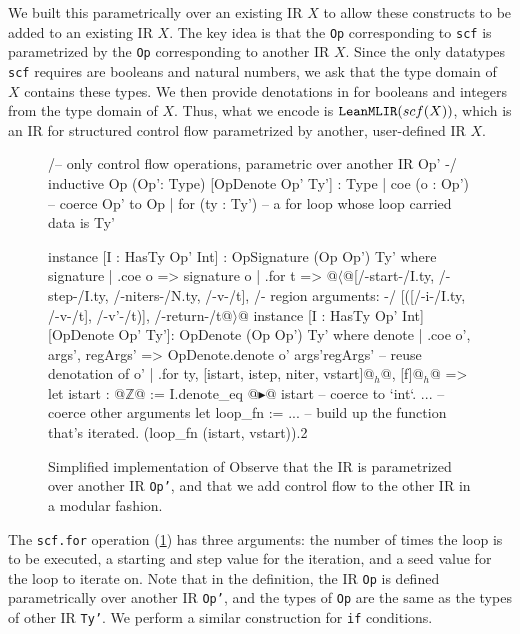 We built this parametrically over an existing IR $X$ to allow these constructs to be added to an existing IR $X$.
The key idea is that the \texttt{Op} corresponding to \texttt{scf} is parametrized by the \texttt{Op} corresponding to another IR $X$.
Since the only datatypes \texttt{scf} requires are booleans and natural numbers, we ask that the type domain of $X$ contains these types.
We then provide denotations in  for booleans and integers from the type domain of $X$.
Thus, what we encode is $\texttt{LeanMLIR}(scf(X))$, which is an IR for structured control flow parametrized by another, user-defined IR $X$.

\begin{figure}
\begin{leanfootnotesize}
/-- only control flow operations, parametric over another IR Op'  -/
inductive Op (Op': Type) [OpDenote Op' Ty'] : Type
| coe (o : Op') -- coerce Op' to Op
| for (ty : Ty') -- a for loop whose loop carried data is Ty'

instance [I : HasTy Op' Int] : OpSignature (Op Op') Ty' where
  signature
  | .coe o => signature o
  | .for t => @$\langle$@[/-start-/I.ty, /-step-/I.ty, /-niters-/N.ty, /-v-/t],
     /- region arguments: -/ [([/-i-/I.ty, /-v-/t], /-v'-/t)],
     /-return-/t@$\rangle$@
instance [I : HasTy Op' Int] [OpDenote Op' Ty']: OpDenote (Op Op') Ty' where
  denote
  | .coe o', args', regArgs' => OpDenote.denote o' args'regArgs' -- reuse denotation of o'
  | .for ty, [istart, istep, niter, vstart]@$_h$@, [f]@$_h$@ =>
	let istart : @$\mathbb{Z}$@ := I.denote_eq @$\blacktriangleright$@ istart -- coerce to `int`.
	... -- coerce other arguments
	let loop_fn := ... -- build up the function that's iterated.
	(loop_fn (istart, vstart)).2
\end{leanfootnotesize}
\caption{Simplified implementation of  Observe that the IR is parametrized over another IR \texttt{Op'},
and that we add control flow to the other IR in a modular fashion.}
\label{fig:mlir:scf-impl}
\end{figure}

The \texttt{scf.for} operation (\cref{fig:mlir:scf-impl}) has three arguments: the number of times the loop is to be executed, a starting and step value for the iteration, and a seed value for the loop to iterate on.
Note that in the definition, the IR \texttt{Op} is defined parametrically over another IR \texttt{Op'}, and the types of \texttt{Op} are the same as the types of other IR \texttt{Ty'}.
We perform a similar construction for \texttt{if} conditions.


